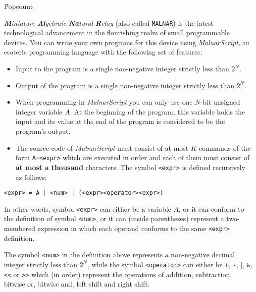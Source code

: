\begin{statement}[
  problempoints=110,
  timelimit=1 sekunda,
  memorylimit=512 MiB,
]{Popcount}

\textit{\textbf{M}iniature \textbf{Al}gebraic \textbf{Na}tural \textbf{R}elay}
(also called \texttt{MALNAR}) is the latest technological advancement in
the flourishing realm of small programmable devices. You can write
your own programs for this device using \textit{MalnarScript}, an esoteric
programming language with the following set of features:

\begin{itemize}[topsep=0pt]
   \item Input to the program is a single non-negative integer strictly less
         than $2^N$.
   \item Output of the program is a single non-negative integer strictly less
         than $2^N$.
   \item When programming in \textit{MalnarScript} you can only use one $N$-bit
         unsigned integer variable $A$. At the beginning of the program, this
         variable holds the input and its value at the end of the program is
         considered to be the program's output.
   \item The source code of \textit{MalnarScript} must consist of at most $K$
         commands of the form \texttt{A=<expr>} which are executed in
         order and each of them must consist of \textbf{at most a thousand}
         characters. The symbol \texttt{<expr>} is defined recursively as
         follows:
\end{itemize}

\begin{center}
  \texttt{<expr> = A | <num> | (<expr><operator><expr>)}
\end{center}

In other words, symbol \texttt{<expr>} can either be a variable $A$, or it can
conform to the definition of symbol \texttt{<num>}, or it can (inside parentheses)
represent a two-membered expression in which each operand conforms to the same
\texttt{<expr>} definition.

The symbol \texttt{<num>} in the definition above represents a non-negative
decimal integer strictly less than $2^N$, while the symbol
\verb|<operator>| can either be \verb|+|, \verb|-|, \verb|||,
\verb|&|, \verb|<<| or \verb|>>| which (in order) represent the operations
of addition, subtraction, bitwise or, bitwise and, left shift and right shift.


\end{statement}

